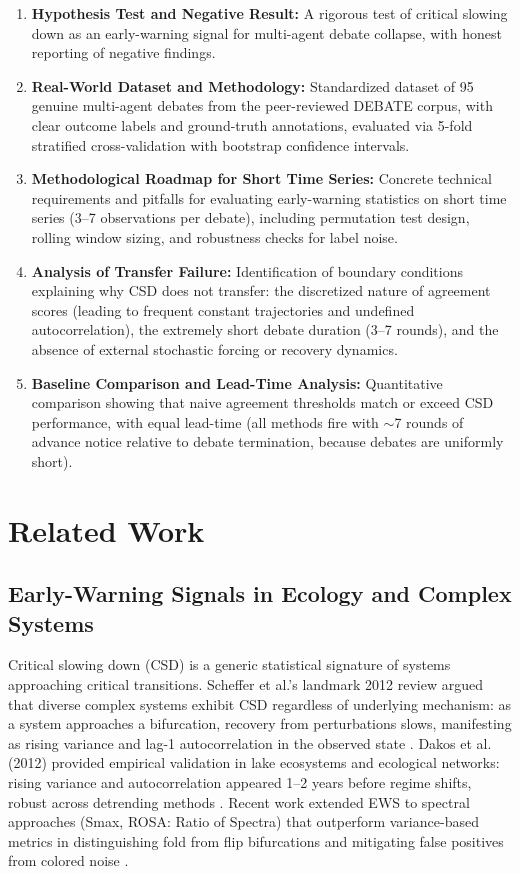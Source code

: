 \documentclass[11pt,letterpaper]{article}
\begin{document}
\begin{enumerate}
\item \textbf{Hypothesis Test and Negative Result:} A rigorous test of critical slowing down as an early-warning signal for multi-agent debate collapse, with honest reporting of negative findings.

\item \textbf{Real-World Dataset and Methodology:} Standardized dataset of 95 genuine multi-agent debates from the peer-reviewed DEBATE corpus, with clear outcome labels and ground-truth annotations, evaluated via 5-fold stratified cross-validation with bootstrap confidence intervals.

\item \textbf{Methodological Roadmap for Short Time Series:} Concrete technical requirements and pitfalls for evaluating early-warning statistics on short time series (3--7 observations per debate), including permutation test design, rolling window sizing, and robustness checks for label noise.

\item \textbf{Analysis of Transfer Failure:} Identification of boundary conditions explaining why CSD does not transfer: the discretized nature of agreement scores (leading to frequent constant trajectories and undefined autocorrelation), the extremely short debate duration (3--7 rounds), and the absence of external stochastic forcing or recovery dynamics.

\item \textbf{Baseline Comparison and Lead-Time Analysis:} Quantitative comparison showing that naive agreement thresholds match or exceed CSD performance, with equal lead-time (all methods fire with $\sim$7 rounds of advance notice relative to debate termination, because debates are uniformly short).
\end{enumerate}

\section{Related Work}

\subsection{Early-Warning Signals in Ecology and Complex Systems}

Critical slowing down (CSD) is a generic statistical signature of systems approaching critical transitions. Scheffer et al.'s landmark 2012 review argued that diverse complex systems exhibit CSD regardless of underlying mechanism: as a system approaches a bifurcation, recovery from perturbations slows, manifesting as rising variance and lag-1 autocorrelation in the observed state \citep{Scheffer2012}. Dakos et al. (2012) provided empirical validation in lake ecosystems and ecological networks: rising variance and autocorrelation appeared 1--2 years before regime shifts, robust across detrending methods \citep{Dakos2012}. Recent work extended EWS to spectral approaches (Smax, ROSA: Ratio of Spectra) that outperform variance-based metrics in distinguishing fold from flip bifurcations and mitigating false positives from colored noise \citep{Bury2020,Clarke2023}.
\end{document}
